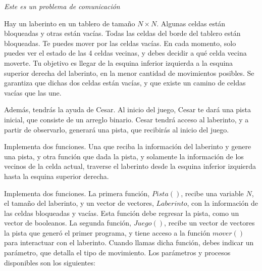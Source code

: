 \documentclass[12pt]{scrartcl}
\begin{document}
    
    {\itshape Este es un problema de comunicación}
    
    \vspace{10pt}

    Hay un laberinto en un tablero de tamaño $N\times N$. Algunas celdas están bloqueadas y otras están vacías. Todas las celdas del borde del tablero están bloqueadas. Te puedes mover por las celdas vacías. En cada momento, solo puedes ver el estado de las 4 celdas vecinas, y debes decidir a qué celda vecina moverte. Tu objetivo es llegar de la esquina inferior izquierda a la esquina superior derecha del laberinto, en la menor cantidad de movimientos posibles. Se garantiza que dichas dos celdas están vacías, y que existe un camino de celdas vacías que las une. 

    Además, tendrás la ayuda de Cesar. Al inicio del juego, Cesar te dará una pista inicial, que consiste de un arreglo binario. Cesar tendrá acceso al laberinto, y a partir de observarlo, generará una pista, que recibirás al inicio del juego. 

    
    Implementa dos funciones. Una que reciba la información del laberinto y genere una pista, y otra función que dada la pista, y solamente la información de los vecinos de la celda actual, traverse el laberinto desde la esquina inferior izquierda hasta la esquina superior derecha.


    Implementa dos funciones. La primera función, $Pista()$, recibe una variable $N$, el tamaño del laberinto, y un vector de vectores, $Laberinto$, con la información de las celdas bloqueadas y vacías. Esta función debe regresar la pista, como un vector de booleanos. La segunda función, $Juego()$, recibe un vector de vectores la pista que generó el primer programa, y tiene acceso a la función $mover()$ para interactuar con el laberinto. Cuando llamas dicha función, debes indicar un parámetro, que detalla el tipo de movimiento. Los parámetros y procesos disponibles son los siguientes:
\end{document}
